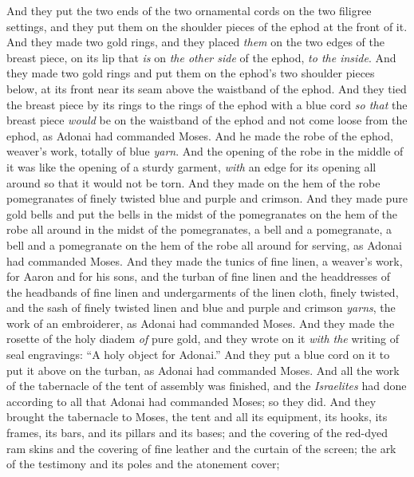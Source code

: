 \begin{biblechapter}
\verse And they put the two ends of the two ornamental cords on the two filigree settings, and they put them on the shoulder pieces of the ephod at the front of it.
\verse And they made two gold rings, and they placed \textit{them} on the two edges of the breast piece, on its lip that \textit{is} on \textit{the other side} of the ephod, \textit{to the inside}.
\verse And they made two gold rings and put them on the ephod’s two shoulder pieces below, at its front near its seam above the waistband of the ephod.
\verse And they tied the breast piece by its rings to the rings of the ephod with a blue cord \textit{so that} the breast piece \textit{would} be on the waistband of the ephod and not come loose from the ephod, as Adonai had commanded Moses.
\verse And he made the robe of the ephod, weaver’s work, totally of blue \textit{yarn}.
\verse And the opening of the robe in the middle of it was like the opening of a sturdy garment, \textit{with} an edge for its opening all around so that it would not be torn.
\verse And they made on the hem of the robe pomegranates of finely twisted blue and purple and crimson.
\verse And they made pure gold bells and put the bells in the midst of the pomegranates on the hem of the robe all around in the midst of the pomegranates,
\verse a bell and a pomegranate, a bell and a pomegranate on the hem of the robe all around for serving, as Adonai had commanded Moses.
\verse And they made the tunics of fine linen, a weaver’s work, for Aaron and for his sons,
\verse and the turban of fine linen and the headdresses of the headbands of fine linen and undergarments of the linen cloth, finely twisted,
\verse and the sash of finely twisted linen and blue and purple and crimson \textit{yarns}, the work of an embroiderer, as Adonai had commanded Moses.
\verse And they made the rosette of the holy diadem \textit{of} pure gold, and they wrote on it \textit{with the} writing of seal engravings: “A holy object for Adonai.”
\verse And they put a blue cord on it to put it above on the turban, as Adonai had commanded Moses.
 And all the work of the tabernacle of the tent of assembly was finished, and the \textit{Israelites} had done according to all that Adonai had commanded Moses; so they did.
\verse And they brought the tabernacle to Moses, the tent and all its equipment, its hooks, its frames, its bars, and its pillars and its bases;
\verse and the covering of the red-dyed ram skins and the covering of fine leather and the curtain of the screen;
\verse the ark of the testimony and its poles and the atonement cover;

\end{biblechapter}
